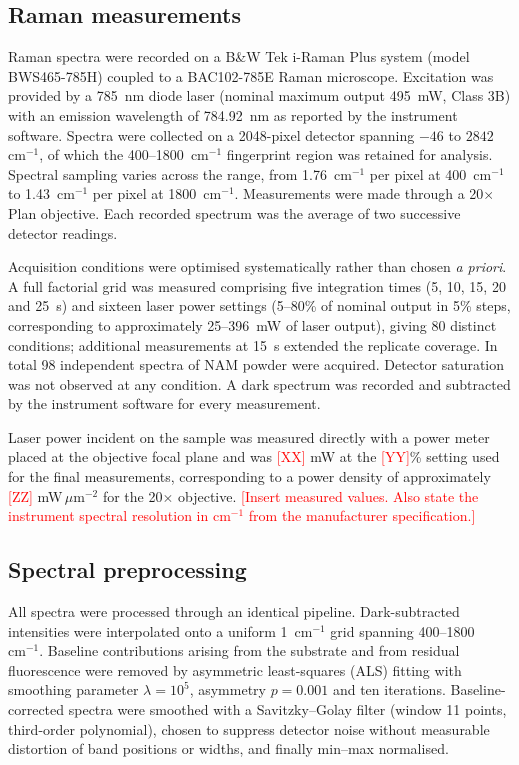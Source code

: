 \documentclass[preprint,12pt]{elsarticle}
\newcommand{\wn}{\ensuremath{\mathrm{cm}^{-1}}}
\newcommand{\authorcheck}[1]{\textcolor{red}{[#1]}}
\begin{document}
\subsection{Raman measurements}

Raman spectra were recorded on a B\&W Tek i-Raman Plus system (model
BWS465-785H) coupled to a BAC102-785E Raman microscope. Excitation was provided
by a 785~nm diode laser (nominal maximum output 495~mW, Class 3B) with an
emission wavelength of 784.92~nm as reported by the instrument software.
Spectra were collected on a 2048-pixel detector spanning $-46$ to
$2842$~\wn{}, of which the 400--1800~\wn{} fingerprint region was retained for
analysis. Spectral sampling varies across the range, from 1.76~\wn{} per pixel
at 400~\wn{} to 1.43~\wn{} per pixel at 1800~\wn{}. Measurements were made through a
20$\times$ Plan objective. Each recorded spectrum was the average of two
successive detector readings.

Acquisition conditions were optimised systematically rather than chosen
\emph{a priori}. A full factorial grid was measured comprising five integration
times (5, 10, 15, 20 and 25~s) and sixteen laser power settings (5--80\% of
nominal output in 5\% steps, corresponding to approximately 25--396~mW of laser
output), giving 80 distinct conditions; additional measurements at 15~s extended
the replicate coverage. In total 98 independent spectra of NAM powder were
acquired. Detector saturation was not observed at any condition. A dark
spectrum was recorded and subtracted by the instrument software for every
measurement.

Laser power incident on the sample was measured directly with a power meter
placed at the objective focal plane and was \authorcheck{XX} mW at the
\authorcheck{YY}\% setting used for the final measurements, corresponding to a
power density of approximately \authorcheck{ZZ} mW\,$\mu$m$^{-2}$ for the
20$\times$ objective. \authorcheck{Insert measured values. Also state the
instrument spectral resolution in \wn{} from the manufacturer specification.}

\subsection{Spectral preprocessing}

All spectra were processed through an identical pipeline. Dark-subtracted
intensities were interpolated onto a uniform 1~\wn{} grid spanning
400--1800~\wn{}. Baseline contributions arising from the substrate and from
residual fluorescence were removed by asymmetric least-squares (ALS) fitting \cite{eilers2005}
with smoothing parameter $\lambda = 10^{5}$, asymmetry $p = 0.001$ and ten
iterations. Baseline-corrected spectra were smoothed with a
Savitzky--Golay filter \cite{savitzky1964} (window 11 points, third-order
polynomial), chosen to
suppress detector noise without measurable distortion of band positions or
widths, and finally min--max normalised.
\end{document}
